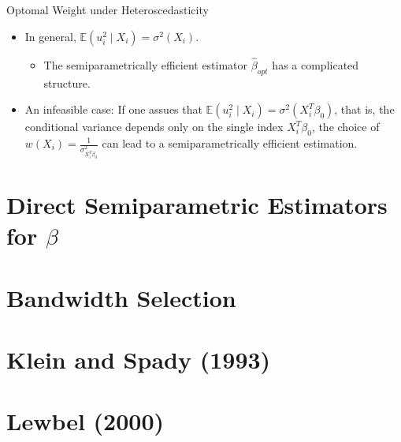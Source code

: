 \documentclass[xcolor=svgnames,dvipdfmx,cjk]{beamer}
\theoremstyle{example}
\def\E{\mathbb{E}}
\begin{document}
\begin{frame}{Optomal Weight under Heteroscedasticity}
  \begin{itemize}
    \item In general, $\E(u_i^2 \mid X_i) = \sigma^2(X_i)$.
      \begin{itemize}
        \item The semiparametrically efficient estimator $\hat{\beta}_{opt}$ has a complicated structure.
      \end{itemize}
    \item \alert{An infeasible case}: 
          If one assues that  $\E(u_i^2 \mid X_i) = \sigma^2(X_i^{T}\beta_0)$,
          that is, the conditional variance depends only on the single index $X_i^{T}\beta_0$,
          the choice of $w(X_i) = \frac{1}{\sigma^2_{X_i^{T}\beta_0}}$ can lead to a semiparametrically efficient estimation.
  \end{itemize}
\end{frame}



\section{Direct Semiparametric Estimators for $\beta$}










\section{Bandwidth Selection}









\section{Klein and Spady (1993)}









\section{Lewbel (2000)}
\end{document}
